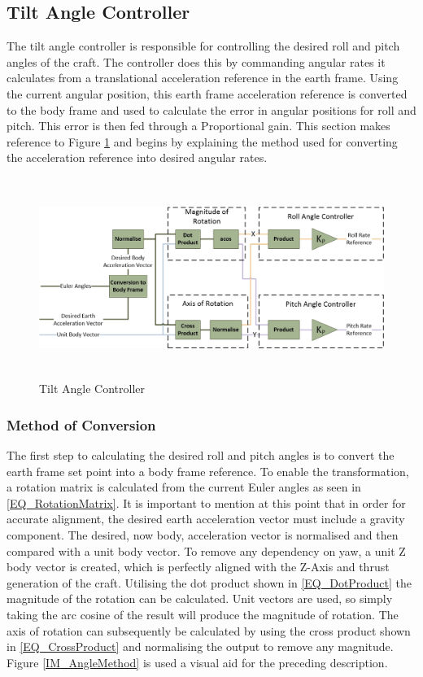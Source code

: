 \documentclass[12pt]{report}
\begin{document}
\subsection{Tilt Angle Controller}
The tilt angle controller is responsible for controlling the desired roll and pitch angles of the craft. The controller does this by commanding angular rates it calculates from a translational acceleration reference in the earth frame. Using the current angular position, this earth frame acceleration reference is converted to the body frame and used to calculate the error in angular positions for roll and pitch. This error is then fed through a Proportional gain. This section makes reference to Figure \ref{IM_TiltAngleController} and begins by explaining the method used for converting the acceleration reference into desired angular rates.

\begin{figure}[H]
	\centering
	\includegraphics[height = 6.5cm]{../References/Diagrams/TiltAngleController.jpg}
	\caption{Tilt Angle Controller}
	\label{IM_TiltAngleController}
\end{figure}

\subsubsection{Method of Conversion}	
The first step to calculating the desired roll and pitch angles is to convert the earth frame set point into a body frame reference. To enable the transformation, a rotation matrix is calculated from the current Euler angles as seen in \eqref{EQ_RotationMatrix}. It is important to mention at this point that in order for accurate alignment, the desired earth acceleration vector must include a gravity component. The desired, now body, acceleration vector is normalised and then compared with a unit body vector. To remove any dependency on yaw, a unit Z body vector is created, which is perfectly aligned with the Z-Axis and thrust generation of the craft. Utilising the dot product shown in \eqref{EQ_DotProduct} the magnitude of the rotation can be calculated. Unit vectors are used, so simply taking the arc cosine of the result will produce the magnitude of rotation. The axis of rotation can subsequently be calculated by using the cross product shown in \eqref{EQ_CrossProduct} and normalising the output to remove any magnitude. Figure \ref{IM_AngleMethod} is used a visual aid for the preceding description.
\end{document}

